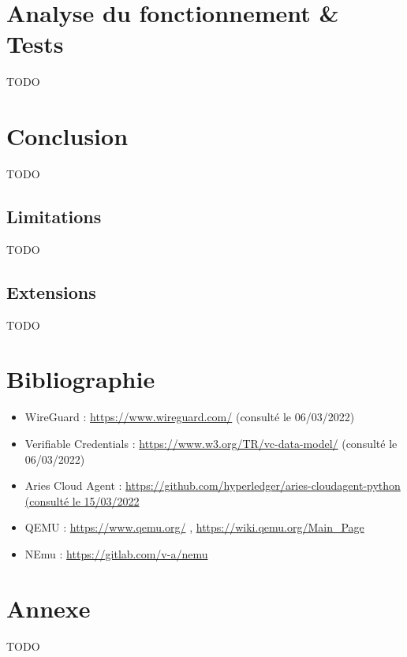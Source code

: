 \documentclass[12pt, openany]{report}
\begin{document}
\section{Analyse du fonctionnement \& Tests}
\noindent 
\begin{flushleft}
TODO
\end{flushleft}

\section{Conclusion}
\noindent 
\begin{flushleft}
TODO
\end{flushleft}
\subsection{Limitations}
\noindent 
\begin{flushleft}
TODO
\end{flushleft}
\subsection{Extensions}
\noindent 
\begin{flushleft}
TODO
\end{flushleft}

\section{Bibliographie}
\noindent 
\begin{itemize}

\item WireGuard : \url{https://www.wireguard.com/} (consulté le 06/03/2022) 
\item Verifiable Credentials : \url{https://www.w3.org/TR/vc-data-model/} (consulté le 06/03/2022) 
\item Aries Cloud Agent : \url{https://github.com/hyperledger/aries-cloudagent-python (consulté le 15/03/2022} 
\item QEMU : \url{https://www.qemu.org/} , \url{https://wiki.qemu.org/Main_Page}
\item NEmu : \url{https://gitlab.com/v-a/nemu}

\end{itemize}

\section{Annexe}
\noindent 
\begin{flushleft}
TODO
\end{flushleft}
\end{document}
